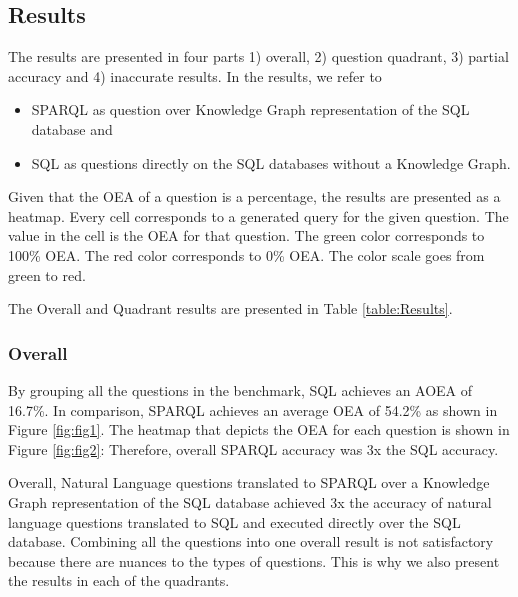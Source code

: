 \documentclass[11pt]{article}
\begin{document}
\newpage



\subsection{Results}
\label{sec:Results}


The results are presented in four parts 1) overall, 2) question quadrant, 3) partial accuracy and 4) inaccurate results. 
In the results, we refer to
\begin{itemize}
    \item SPARQL as question over Knowledge Graph representation of the SQL database and 
    \item SQL as questions directly on the SQL databases without a Knowledge Graph.
\end{itemize}


Given that the OEA of a question is a percentage, the results are presented as a heatmap. 
Every cell corresponds to a generated query for the given question. The value in the cell is the OEA for that question. 
The green color corresponds to 100\% OEA. The red color corresponds to 0\% OEA. The color scale goes from green to red.

The Overall and Quadrant results are presented in Table \ref{table:Results}.

\subsubsection{Overall}
By grouping all the questions in the benchmark, SQL achieves an AOEA of 16.7\%. 
In comparison, SPARQL achieves an average OEA of 54.2\% as shown in Figure \ref{fig:fig1}. 
The heatmap that depicts the OEA for each question is shown in Figure \ref{fig:fig2}:
Therefore, overall SPARQL accuracy was 3x the SQL accuracy.

Overall, Natural Language questions translated to SPARQL over a Knowledge Graph representation of the SQL database achieved 3x the accuracy of natural language questions translated to SQL and executed directly over the SQL database. 
Combining all the questions into one overall result is not satisfactory because there are nuances to the types of questions. 
This is why we also present the results in each of the quadrants.
\end{document}

